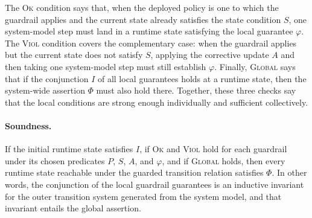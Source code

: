 The \textsc{Ok} condition says that, when the deployed policy is one to which the guardrail applies and the current state already satisfies the state condition $S$, one system-model step must land in a runtime state satisfying the local guarantee $\varphi$. The \textsc{Viol} condition covers the complementary case: when the guardrail applies but the current state does not satisfy $S$, applying the corrective update $A$ and then taking one system-model step must still establish $\varphi$. Finally, \textsc{Global} says that if the conjunction $I$ of all local guarantees holds at a runtime state, then the system-wide assertion $\Phi$ must also hold there. Together, these three checks say that the local conditions are strong enough individually and sufficient collectively.

\paragraph{Soundness.}
If the initial runtime state satisfies $I$, if \textsc{Ok} and \textsc{Viol} hold for each guardrail under its chosen predicates $P$, $S$, $A$, and $\varphi$, and if \textsc{Global} holds, then every runtime state reachable under the guarded transition relation satisfies $\Phi$.
In other words, the conjunction of the local guardrail guarantees is an inductive invariant for the outer transition system generated from the system model, and that invariant entails the global \perfsafety assertion.

\fi